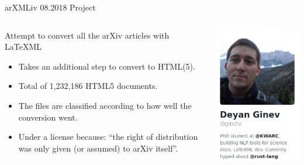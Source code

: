 \documentclass[9pt]{beamer}
\begin{document}
\begin{frame}{arXMLiv 08.2018 Project}
    \begin{columns}[T]
        \begin{column}{0.8\textwidth}
    Attempt to convert all the arXiv articles with LaTeXML 
            \begin{itemize}
                \item Takes an additional step to convert to HTML(5).
                \item Total of 1,232,186 HTML5 documents.
                \item The files are classified according to how well the conversion went.
                \item Under a license because: ``the right of distribution was only given (or assumed) to arXiv itself''.
            \end{itemize}
        \end{column}
        \begin{column}{0.3\textwidth}
    \includegraphics[width=\textwidth]{ginev_profile.png}

\end{column}
\end{columns}
\end{frame}
\end{document}
